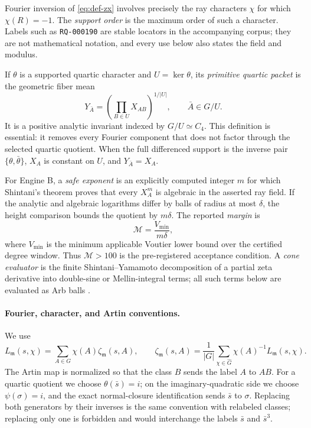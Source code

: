 \documentclass[11pt]{article}
\begin{document}
Fourier inversion of \eqref{eq:def-zx} involves precisely the ray characters
\(\chi\) for which \(\chi(R)=-1\).  The \emph{support order} is the
maximum order of such a character.  Labels such as
\texttt{RQ-000190} are stable locators in the accompanying corpus;
they are not mathematical notation, and every use below also states
the field and modulus.

If \(\theta\) is a supported quartic character and
\(U=\ker\theta\), its \emph{primitive quartic packet} is the
geometric fiber mean
\begin{equation}\label{eq:quartic-packet}
 Y_{\bar A}
 =\left(\prod_{B\in U}X_{AB}\right)^{1/|U|},
 \qquad \bar A\in G/U.
\end{equation}
It is a positive analytic invariant indexed by \(G/U\simeq C_4\).
This definition is essential: it removes every Fourier component
that does not factor through the selected quartic quotient.  When
the full differenced support is the inverse pair
\(\{\theta,\bar\theta\}\), \(X_A\) is constant on \(U\), and
\(Y_{\bar A}=X_A\).

For Engine B, a \emph{safe exponent} is an explicitly computed
integer \(m\) for which Shintani's theorem proves that every
\(X_A^m\) is algebraic in the asserted ray field.  If the analytic
and algebraic logarithms differ by balls of radius at most \(\delta\),
the height comparison bounds the quotient by \(m\delta\).  The
reported \emph{margin} is
\begin{equation}\label{eq:margin}
 \mathcal M=\frac{V_{\min}}{m\delta},
\end{equation}
where \(V_{\min}\) is the minimum applicable Voutier lower bound over
the certified degree window.  Thus \(\mathcal M>100\) is the
pre-registered acceptance condition.  A \emph{cone evaluator} is the
finite Shintani--Yamamoto decomposition of a partial zeta derivative
into double-sine or Mellin-integral terms; all such terms below are
evaluated as Arb balls
\cite{Tangedal2007,Yamamoto2010}.

\paragraph{Fourier, character, and Artin conventions.}
\label{par:conventions}
We use
\[
 L_{\mathfrak m}(s,\chi)
 =\sum_{A\in G}\chi(A)\zeta_{\mathfrak m}(s,A),
 \qquad
 \zeta_{\mathfrak m}(s,A)
 =\frac1{|G|}\sum_{\chi\in\widehat G}
   \chi(A)^{-1}L_{\mathfrak m}(s,\chi).
\]
The Artin map is normalized so that the class \(B\) sends the label
\(A\) to \(AB\).  For a quartic quotient we choose
\(\theta(\bar s)=i\); on the imaginary-quadratic side we choose
\(\psi(\sigma)=i\), and the exact normal-closure identification sends
\(\bar s\) to \(\sigma\).  Replacing both generators by their inverses
is the same convention with relabeled classes; replacing only one is
forbidden and would interchange the labels
\(\bar s\) and \(\bar s^3\).
\end{document}
